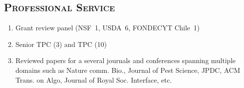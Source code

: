 \documentclass[margin,10pt]{res} %
\begin{document}
\begin{resume}
\section{\textnormal{\textsc{Professional Service}}}
\begin{enumerate}[$\circ$]
    \iftoggle{compact}{}{
    \item Professional service: 
    \begin{itemize}
    }
        \item Grant review panel (NSF~1, USDA~6, FONDECYT Chile~1)
        \item Senior TPC (3) and TPC (10)
        \item Reviewed papers for a several journals and conferences
        spanning multiple domains such as Nature comm. Bio., Journal of
        Pest Science, JPDC, ACM Trans. on Algo, Journal of Royal Soc.
        Interface, etc.
        \iftoggle{compact}{}{
    \end{itemize}
    \item Biocomplexity Institute \& Initiative:
    \begin{itemize}
        \item Student and postdoc hiring committee in NSSAC 2018--2020.
        \item Student and postdoc hiring committee in NDSSL 2017--2018.
\item Member of graduate students admission team in NDSSL for the Fall'16
admissions
    \end{itemize}
}
\end{enumerate}

\iftoggle{compact}{}{
}
\end{resume}
\end{document}
